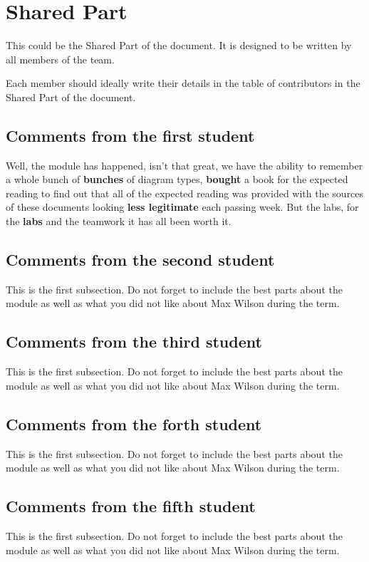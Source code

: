\section{Shared Part}

This could be the Shared Part of the document. It is designed to be written by all members of the team.

Each member should ideally write their details in the table of contributors in the Shared Part of the document.

\subsection{Comments from the first student}
Well, the module has happened, isn't that great, we have the ability to remember a whole bunch of \textbf{bunches} of diagram types, \textbf{bought} a book for the expected reading to find out that all of the expected reading was provided with the sources of these documents looking \textbf{less legitimate} each passing week. But the labs, for the \textbf{labs} and the teamwork it has all been worth it.


\subsection{Comments from the second student}
This is the first subsection. Do not forget to include the best parts about the module as well as what you did not like about Max Wilson during the term.

\subsection{Comments from the third student}
This is the first subsection. Do not forget to include the best parts about the module as well as what you did not like about Max Wilson during the term.

\subsection{Comments from the forth student}
This is the first subsection. Do not forget to include the best parts about the module as well as what you did not like about Max Wilson during the term.

\subsection{Comments from the fifth student}
This is the first subsection. Do not forget to include the best parts about the module as well as what you did not like about Max Wilson during the term.

